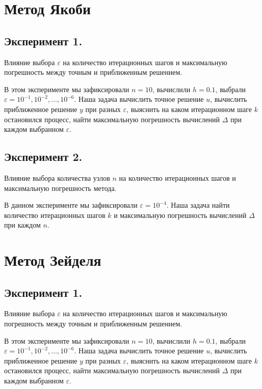 \chapter{Метод Якоби}

\section{Эксперимент 1.}

Влияние выбора $\varepsilon$ на количество итерационных шагов и максимальную погрешность между точным и приближенным решением.

В этом эксперименте мы зафиксировали $n = 10$, вычислили $h=0.1$, выбрали $\varepsilon = 10^{-1}, 10^{-2}, \dots, 10^{-6}$. Наша задача вычислить точное решение $u$, вычислить приближенное решение $y$ при разных $\varepsilon$, выяснить на каком итерационном шаге $k$  остановился процесс, найти максимальную погрешность вычислений $\Delta$ при каждом выбранном $\varepsilon$.



\section{Эксперимент 2.}

Влияние выбора количества узлов $n$ на количество итерационных шагов и максимальную погрешность метода.

В данном эксперименте мы зафиксировали $\varepsilon = 10^{-4}$. Наша задача найти количество итерационных шагов $k$ и максимальную погрешность вычислений $\Delta$ при каждом $n$.



\chapter{Метод Зейделя}

\section{Эксперимент 1.}

Влияние выбора $\varepsilon$ на количество итерационных шагов и максимальную погрешность между точным и приближенным решением.

В этом эксперименте мы зафиксировали $n = 10$, вычислили $h=0.1$, выбрали $\varepsilon = 10^{-1}, 10^{-2}, \dots, 10^{-6}$. Наша задача вычислить точное решение $u$, вычислить приближенное решение $y$ при разных $\varepsilon$, выяснить на каком итерационном шаге $k$  остановился процесс, найти максимальную погрешность вычислений $\Delta$ при каждом выбранном $\varepsilon$.

